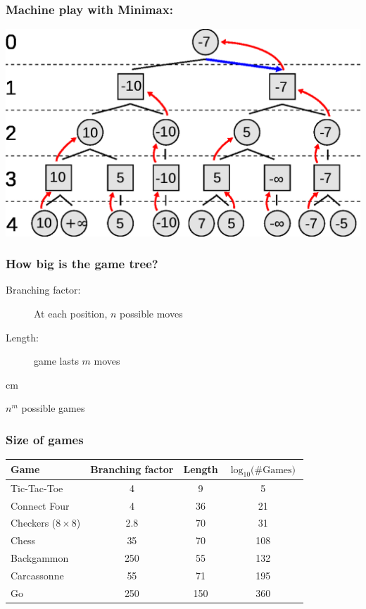 \documentclass{beamer}
\begin{document}
\begin{frame}
  \frametitle{Machine play with Minimax:}
  \begin{center}
    \includegraphics[width=\textwidth]{minimax}
  \end{center}
\end{frame}

\begin{frame}
  \frametitle{How big is the game tree?}
  \begin{description}
  \item[Branching factor:] At each position, $n$ possible moves
  \item[Length:] game lasts $m$ moves
  \end{description}
   cm
  \begin{tcolorbox}
    \begin{center}
      $n^m$ possible games
    \end{center}
  \end{tcolorbox}
\end{frame}


\begin{frame}
  \frametitle{Size of games}
  \begin{tabular}{l|ccc}
    Game & Branching factor & Length & $\log_{10}\mbox{(\# Games)}$\\ \hline
    Tic-Tac-Toe & 4 & 9 & 5 \\
    Connect Four & 4 & 36 & 21 \\
    Checkers ($8\times 8$) & 2.8 & 70 & 31 \\
    Chess & 35 & 70 & 108 \\
    Backgammon & 250 & 55 & 132 \\
    Carcassonne & 55 & 71 & 195 \\
    Go & 250 & 150 & 360
  \end{tabular}
\end{frame}
\end{document}

